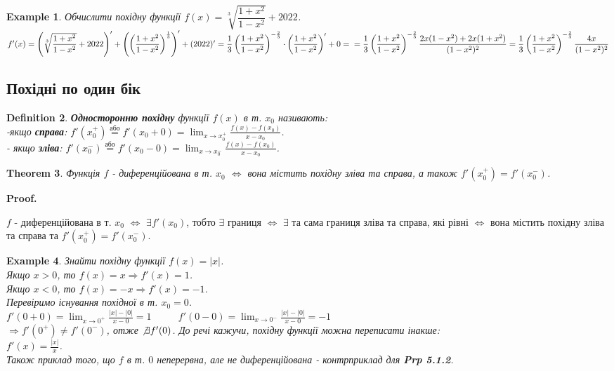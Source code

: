 \documentclass[a4paper, 14pt]{article}
\makeatletter
\def\huge{\displaystyle}
\def\qed{$\blacksquare$}
\theoremstyle{theoremdd}
\newtheorem{theorem}{Theorem}[subsection]
\theoremstyle{theoremdd}
\newtheorem{definition}[theorem]{Definition}
\theoremstyle{theoremdd}
\theoremstyle{theoremdd}
\newtheorem{example}[theorem]{Example}
\theoremstyle{theoremdd}
\theoremstyle{theoremdd}
\theoremstyle{theoremdd}
\theoremstyle{theoremdd}
\renewenvironment{proof}[1][Proof.\\]{\par
\pushQED{\hfill \qed}%
\normalfont \topsep6\p@\@plus6\p@\relax
\trivlist
\item\relax
{\bfseries
#1\@addpunct{.}}\hspace\labelsep\ignorespaces
}{%
\popQED\endtrivlist\@endpefalse
}
\makeatother
\begin{document}
\begin{example} Обчислити похідну функції $f(x) = \sqrt[3]{\dfrac{1+x^2}{1-x^2}} + 2022$.\\
$f'(x) = \left( \sqrt[3]{\dfrac{1+x^2}{1-x^2}} + 2022 \right)' + \left(\left( \dfrac{1+x^2}{1-x^2} \right)^{\frac{1}{3}} \right)' + (2022)' = \dfrac{1}{3} \left( \dfrac{1+x^2}{1-x^2} \right)^{-\frac{2}{3}} \cdot \left( \dfrac{1+x^2}{1-x^2} \right)' + 0 = \\ = \dfrac{1}{3} \left( \dfrac{1+x^2}{1-x^2} \right)^{-\frac{2}{3}} \dfrac{2x(1-x^2)+2x(1+x^2)}{(1-x^2)^2} = \dfrac{1}{3} \left( \dfrac{1+x^2}{1-x^2} \right)^{-\frac{2}{3}} \dfrac{4x}{(1-x^2)^2}$
\end{example}

\subsection{Похідні по один бік}
\begin{definition}
\textbf{Односторонню похідну} функції $f(x)$ в т. $x_0$ називають:\\
-якщо \textbf{справа}: $\huge f'(x_0^+) \overset{\text{або}}{=} f'(x_0+0) = \lim_{x \to x_0^+} \frac{f(x)-f(x_0)}{x-x_0}$.\\
- якщо \textbf{зліва}: $\huge f'(x_0^-) \overset{\text{або}}{=} f'(x_0-0) = \lim_{x \to x_0^-} \frac{f(x)-f(x_0)}{x-x_0}$.
\end{definition}

\begin{theorem}
Функція $f$ - диференційована в т. $x_0$ $\iff$ вона містить похідну зліва та справа, а також $f'(x_0^+) = f'(x_0^-)$.
\end{theorem}

\begin{proof}
$f$ - диференційована в т. $x_0$ $\iff$ $\exists f'(x_0)$, тобто $\exists$ границя $\iff$ $\exists$ та сама границя зліва та справа, які рівні $\iff$ вона містить похідну зліва та справа та $f'(x_0^+) = f'(x_0^-)$.
\end{proof}

\begin{example}
Знайти похідну функції $f(x) = |x|$.\\
Якщо $x>0$, то $f(x) = x \Rightarrow f'(x) = 1$.\\
Якщо $x<0$, то $f(x) = -x \Rightarrow f'(x) = -1$.\\
Перевіримо існування похідної в т. $x_0 = 0$.\\
$f'(0+0) = \huge \lim_{x \to 0^+} \frac{|x|-|0|}{x-0} = 1 \hspace{1cm}$
$f'(0-0) = \huge \lim_{x \to 0^-} \frac{|x|-|0|}{x-0} = -1$\\
$\Rightarrow f'(0^+) \neq f'(0^-)$, отже $\not \exists f'(0)$. До речі кажучи, похідну функції можна переписати інакше:\\
$f'(x) = \huge \frac{|x|}{x}$.\\
Також приклад того, що $f$ в т. $0$ неперервна, але не диференційована - контрприклад для \textbf{Prp 5.1.2}.
\end{example}
\end{document}
